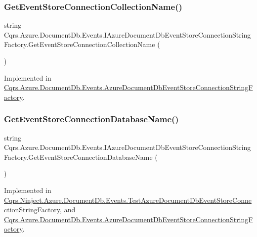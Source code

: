 \subsubsection{\texorpdfstring{Get\+Event\+Store\+Connection\+Collection\+Name()}{GetEventStoreConnectionCollectionName()}}
{\footnotesize\ttfamily string Cqrs.\+Azure.\+Document\+Db.\+Events.\+I\+Azure\+Document\+Db\+Event\+Store\+Connection\+String\+Factory.\+Get\+Event\+Store\+Connection\+Collection\+Name (\begin{DoxyParamCaption}{ }\end{DoxyParamCaption})}



Implemented in \hyperlink{classCqrs_1_1Azure_1_1DocumentDb_1_1Events_1_1AzureDocumentDbEventStoreConnectionStringFactory_a47a2b2315a2ca8daa9355530a241c133_a47a2b2315a2ca8daa9355530a241c133}{Cqrs.\+Azure.\+Document\+Db.\+Events.\+Azure\+Document\+Db\+Event\+Store\+Connection\+String\+Factory}.

\mbox{\label{interfaceCqrs_1_1Azure_1_1DocumentDb_1_1Events_1_1IAzureDocumentDbEventStoreConnectionStringFactory_a826c95e8dab31be9ef97cf3bea92d95d_a826c95e8dab31be9ef97cf3bea92d95d}} 
\subsubsection{\texorpdfstring{Get\+Event\+Store\+Connection\+Database\+Name()}{GetEventStoreConnectionDatabaseName()}}
{\footnotesize\ttfamily string Cqrs.\+Azure.\+Document\+Db.\+Events.\+I\+Azure\+Document\+Db\+Event\+Store\+Connection\+String\+Factory.\+Get\+Event\+Store\+Connection\+Database\+Name (\begin{DoxyParamCaption}{ }\end{DoxyParamCaption})}



Implemented in \hyperlink{classCqrs_1_1Ninject_1_1Azure_1_1DocumentDb_1_1Events_1_1TestAzureDocumentDbEventStoreConnectionStringFactory_a85b4e6cd45d285be6de5db19148118b9_a85b4e6cd45d285be6de5db19148118b9}{Cqrs.\+Ninject.\+Azure.\+Document\+Db.\+Events.\+Test\+Azure\+Document\+Db\+Event\+Store\+Connection\+String\+Factory}, and \hyperlink{classCqrs_1_1Azure_1_1DocumentDb_1_1Events_1_1AzureDocumentDbEventStoreConnectionStringFactory_af243f79315140e1f2c20a5c1695f4fb9_af243f79315140e1f2c20a5c1695f4fb9}{Cqrs.\+Azure.\+Document\+Db.\+Events.\+Azure\+Document\+Db\+Event\+Store\+Connection\+String\+Factory}.

